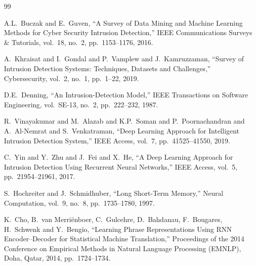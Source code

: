 \documentclass[5p,times]{elsarticle}
\begin{document}
	
	\begin{thebibliography}{99}
		
		A.L.\ Buczak and E.\ Guven,
		``A Survey of Data Mining and Machine Learning Methods for Cyber Security Intrusion Detection,''
		IEEE Communications Surveys \& Tutorials,
		vol.\ 18,
		no.\ 2,
		pp.\ 1153--1176,
		2016.
		
		A.\ Khraisat and I.\ Gondal and P.\ Vamplew and J.\ Kamruzzaman,
		``Survey of Intrusion Detection Systems: Techniques, Datasets and Challenges,''
		Cybersecurity,
		vol.\ 2,
		no.\ 1,
		pp.\ 1--22,
		2019.
		
		D.E.\ Denning,
		``An Intrusion-Detection Model,''
		IEEE Transactions on Software Engineering,
		vol.\ SE-13,
		no.\ 2,
		pp.\ 222--232,
		1987.
		
		R.\ Vinayakumar and M.\ Alazab and K.P.\ Soman and P.\ Poornachandran and A.\ Al-Nemrat and S.\ Venkatraman,
		``Deep Learning Approach for Intelligent Intrusion Detection System,''
		IEEE Access,
		vol.\ 7,
		pp.\ 41525--41550,
		2019.
		
		C.\ Yin and Y.\ Zhu and J.\ Fei and X.\ He,
		``A Deep Learning Approach for Intrusion Detection Using Recurrent Neural Networks,''
		IEEE Access,
		vol.\ 5,
		pp.\ 21954--21961,
		2017.
		
		S.\ Hochreiter and J.\ Schmidhuber,
		``Long Short-Term Memory,''
		Neural Computation,
		vol.\ 9,
		no.\ 8,
		pp.\ 1735--1780,
		1997.
		
		K.\ Cho, B.\ van Merri\"{e}nboer, C.\ Gulcehre, D.\ Bahdanau, F.\ Bougares, H.\ Schwenk and Y.\ Bengio,
		``Learning Phrase Representations Using RNN Encoder--Decoder for Statistical Machine Translation,''
		Proceedings of the 2014 Conference on Empirical Methods in Natural Language Processing (EMNLP),
		Doha, Qatar,
		2014,
		pp.\ 1724--1734.
		

\end{thebibliography}
\end{document}
